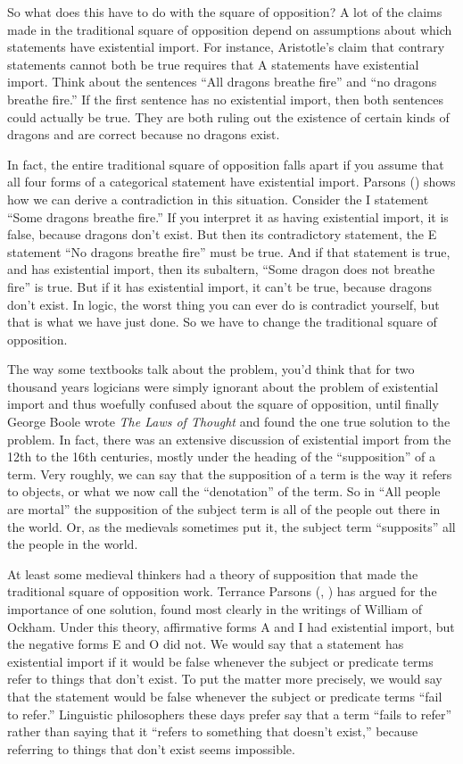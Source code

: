 So what does this have to do with the square of opposition? A lot of the claims made in the traditional square of opposition depend on assumptions about which statements have existential import. For instance, Aristotle's claim that contrary statements cannot both be true requires that A statements have existential import. Think about the sentences ``All dragons breathe fire'' and ``no dragons breathe fire.'' If the first sentence has no existential import, then both sentences could actually be true. They are both ruling out the existence of certain kinds of dragons and are correct because no dragons exist.

In fact, the entire traditional square of opposition falls apart if you assume that all four forms of a categorical statement have existential import. Parsons (\citep{Parsons1997}) shows how we can derive a contradiction in this situation. Consider the I statement ``Some dragons breathe fire.'' If you interpret it as having existential import, it is false, because dragons don't exist. But then its contradictory statement, the E statement ``No dragons breathe fire'' must be true. And if that statement is true, and has existential import, then its subaltern, ``Some dragon does not breathe fire'' is true. But if it has existential import, it can't be true, because dragons don't exist. In logic, the worst thing you can ever do is contradict yourself, but that is what we have just done. So we have to change the traditional square of opposition.

 The way some textbooks talk about the problem, you'd think that for two thousand years logicians were simply ignorant about the problem of existential import and thus woefully confused about the square of opposition, until finally George Boole wrote \textit{The Laws of Thought}\cite{Boole1854} and found the one true solution to the problem. In fact, there was an extensive discussion of existential import from the 12th to the 16th centuries, mostly under the heading of the ``supposition'' of a term. Very roughly, we can say that the supposition of a term is the way it refers to objects, or what we now call the ``denotation'' of the term.\cite{Read2002}
 So in ``All people are mortal'' the supposition of the subject term is all of the people out there in the world. Or, as the medievals sometimes put it, the subject term ``supposits'' all the people in the world.

At least some medieval thinkers had a theory of supposition that made the traditional square of opposition work. Terrance Parsons (\citep{Parsons1997}, \citep{Parsons2008}) has argued for the importance of one solution, found most clearly in the writings of William of Ockham. Under this theory, affirmative forms A and I had existential import, but the negative forms E and O did not. We would say that a statement has existential import if it would be false whenever the subject or predicate terms refer to things that don't exist. To put the matter more precisely, we would say that the statement would be false whenever the subject or predicate terms ``fail to refer.'' Linguistic philosophers these days prefer say that a term ``fails to refer'' rather than saying that it ``refers to something that doesn't exist,'' because referring to things that don't exist seems impossible.

